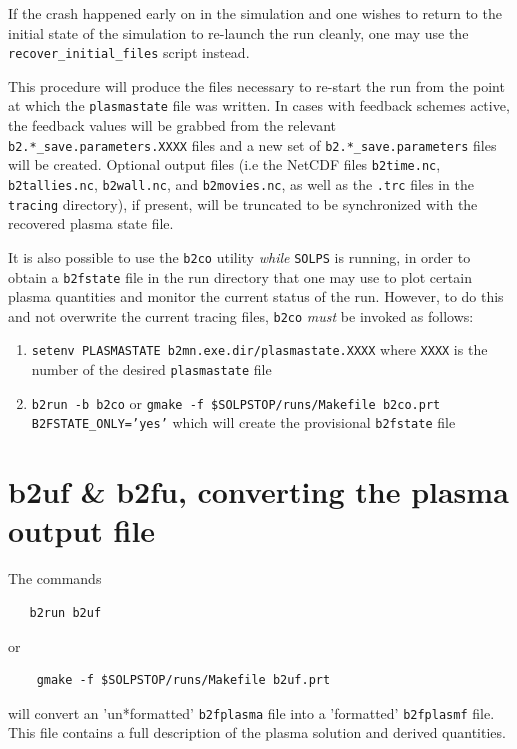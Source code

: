 \documentclass[a4paper,10pt]{report}
\begin{document}
If the crash happened early on in the simulation and one wishes to return to the initial state of the simulation to re-launch the run cleanly, one may use the {\tt recover\_initial\_files} script instead.

This procedure will produce the files necessary to re-start the run from the point at which the {\tt plasmastate} file was written. In cases with feedback schemes active, the feedback values will be grabbed from the relevant {\tt b2.*\_save.parameters.XXXX} files and a new set of {\tt b2.*\_save.parameters} files will be created. Optional output files (i.e the NetCDF files {\tt b2time.nc}, {\tt b2tallies.nc}, {\tt b2wall.nc}, and {\tt b2movies.nc}, as well as the {\tt *.trc} files in the {\tt tracing} directory), if present, will be truncated to be synchronized with the recovered plasma state file.

It is also possible to use the {\tt b2co} utility {\em while} {\tt SOLPS} is running, in order to obtain a {\tt b2fstate} file in the run directory that one may use to plot certain plasma quantities and monitor the current status of the run. However, to do this and not overwrite the current tracing files, {\tt b2co} {\em must} be invoked as follows:
\begin{enumerate}
  \item {\tt setenv PLASMASTATE b2mn.exe.dir/plasmastate.XXXX} where {\tt XXXX} is the number of the desired {\tt plasmastate} file
  \item {\tt b2run -b b2co} or {\tt gmake -f \$SOLPSTOP/runs/Makefile b2co.prt B2FSTATE\_ONLY='yes'} which will create the provisional {\tt b2fstate} file
\end{enumerate}

\newpage
\section{b2uf \& b2fu, converting the plasma output file}
\label{sec:b2uf}\label{sec:b2fu}

The commands
\begin{verbatim}
   b2run b2uf
\end{verbatim}
or
\begin{verbatim}
    gmake -f $SOLPSTOP/runs/Makefile b2uf.prt
\end{verbatim}
will convert an 'un*formatted' {\tt b2fplasma} file into a 'formatted'
{\tt b2fplasmf} file. This file contains a full description of the plasma
solution and derived quantities.
\end{document}
